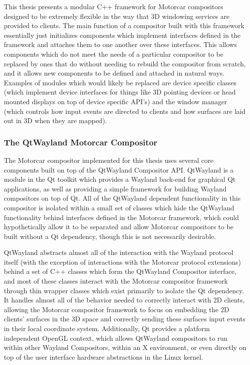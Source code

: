 This thesis presents a modular C++ framework for Motorcar compositors designed to be extremely flexible in the way that 3D windowing services are provided to clients. The main function of a compositor built with this framework essentially just initializes components which implement interfaces defined in the framework and attaches them to one another over these interfaces. This allows components which do not meet the needs of a particular compositor to be replaced by ones that do without needing to rebuild the compositor from scratch, and it allows new components to be defined and attached in natural ways. Examples of modules which would likely be replaced are device specific classes (which implement device interfaces for things like 3D pointing devices or head mounted displays on top of device specific API's) and the window manager (which controls how input events are directed to clients and how surfaces are laid out in 3D when they are mapped).

\subsubsection{The QtWayland Motorcar Compositor}

The Motorcar compositor implemented for this thesis uses several core components built on top of the QtWayland Compositor API. QtWayland is a module in the Qt toolkit which provides a Wayland back-end for graphical Qt applications, as well as providing a simple framework for building Wayland compositors on top of Qt. All of the QtWayland dependent functionality in this compositor is isolated within a small set of classes which hide the QtWayland functionality behind interfaces defined in the Motorcar framework, which could hypothetically allow it to be separated and allow Motorcar compositors to be built without a Qt dependency, though this is not necessarily desirable.  

QtWayland abstracts almost all of the interaction with the Wayland protocol itself (with the exception of interactions with the Motorcar protocol extensions) behind a set of C++ classes which form the QtWayland Compositor interface, and most of these classes interact with the Motorcar compositor framework through thin wrapper classes which exist primarily to isolate the Qt dependency. It handles almost all of the behavior needed to correctly interact with 2D clients, allowing the Motorcar compositor framework to focus on embedding the 2D clients' surfaces in the 3D space and correctly sending these surfaces input events in their local coordinate system. Additionally, Qt provides a platform independent OpenGL context, which allows QtWayland compositors to run within other Wayland Compositors, within an X environment, or even directly on top of the user interface hardware abstractions in the Linux kernel.

